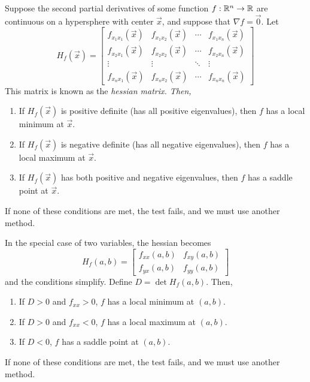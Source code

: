 \begin{theorem}
    Suppose the second partial derivatives of some function \(f: \mathbb{R}^n \to \mathbb{R}\) are continuous on a hypersphere with center \(\vec x\), and suppose that \(\nabla f = \vec 0\). Let 
    \[ H_f(\vec x) = \begin{bmatrix}
        f_{x_1x_1}(\vec x) & f_{x_1x_2}(\vec x) & \cdots & f_{x_1x_n}(\vec x) \\
        f_{x_2x_1}(\vec x) & f_{x_2x_2}(\vec x) & \cdots & f_{x_2x_n}(\vec x) \\
        \vdots & \vdots & \ddots & \vdots \\
        f_{x_nx_1}(\vec x) & f_{x_nx_2}(\vec x) & \cdots & f_{x_nx_n}(\vec x)
    \end{bmatrix}\]
    This matrix is known as the \it{hessian matrix}. Then,
    \begin{enumerate}
        \item If \(H_f(\vec x)\) is positive definite (has all positive eigenvalues), then \(f\) has a local minimum at \(\vec x\).
        \item If \(H_f(\vec x)\) is negative definite (has all negative eigenvalues), then \(f\) has a local maximum at \(\vec x\).
        \item If \(H_f(\vec x)\) has both positive and negative eigenvalues, then \(f\) has a saddle point at \(\vec x\).
    \end{enumerate}
    If none of these conditions are met, the test fails, and we must use another method.\par
    In the special case of two variables, the hessian becomes 
    \[ H_f(a, b) = \begin{bmatrix}
        f_{xx}(a, b) & f_{xy}(a,b) \\
        f_{yx}(a,b) & f_{yy}(a,b)
    \end{bmatrix}\]
    and the conditions simplify. Define \(D=\det H_f(a,b)\). Then,
    \begin{enumerate}
        \item If \(D > 0\) and \(f_{xx} > 0\), \(f\) has a local minimum at \((a, b)\).
        \item If \(D > 0\) and \(f_{xx} < 0\), \(f\) has a local maximum at \((a,b)\).
        \item If \(D < 0\), \(f\) has a saddle point at \((a,b)\).
    \end{enumerate}
    If none of these conditions are met, the test fails, and we must use another method.
\end{theorem}
